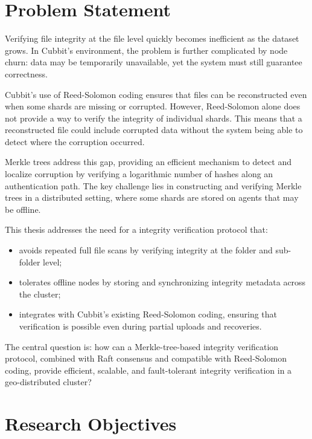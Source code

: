 \section{Problem Statement}
Verifying file integrity at the file level quickly becomes inefficient as the dataset grows. In Cubbit's environment, the problem is further complicated by node churn: data may be temporarily unavailable, yet the system must still guarantee correctness.

Cubbit's use of Reed-Solomon coding ensures that files can be reconstructed even when some shards are missing or corrupted. However, Reed-Solomon alone does not provide a way to verify the integrity of individual shards. This means that a reconstructed file could include corrupted data without the system being able to detect where the corruption occurred.

Merkle trees address this gap, providing an efficient mechanism to detect and localize corruption by verifying a logarithmic number of hashes along an authentication path. The key challenge lies in constructing and verifying Merkle trees in a distributed setting, where some shards are stored on agents that may be offline.

This thesis addresses the need for a integrity verification protocol that:
\begin{itemize}
\item avoids repeated full file scans by verifying integrity at the folder and sub-folder level;
\item tolerates offline nodes by storing and synchronizing integrity metadata across the cluster;
\item integrates with Cubbit's existing Reed-Solomon coding, ensuring that verification is possible even during partial uploads and recoveries.
\end{itemize}

The central question is: how can a Merkle-tree-based integrity verification protocol, combined with Raft consensus and compatible with Reed-Solomon coding, provide efficient, scalable, and fault-tolerant integrity verification in a geo-distributed cluster?

\section{Research Objectives}


